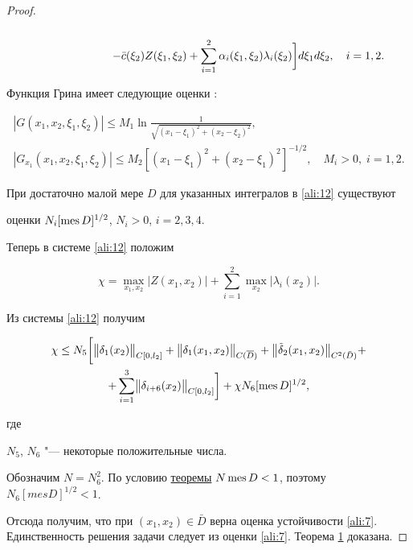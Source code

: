 \begin{proof}
\begin{equation}
\begin{array}{l}
\\

\displaystyle \hspace{2.5cm}

-\bar{c}(\xi_2)Z(\xi_1,\xi_2)+\sum\limits_{i=1}^2{\alpha_i}(\xi_1,\xi_2)\lambda_i(\xi_2)\biggr]d\xi_1d\xi_2, \quad i = 1, 2.

\end{array}

\label{ali:12}

\end{equation}



Функция Грина имеет следующие оценки \cite{ali:bib:25}:

\begin{gather}

|G(x_1,x_2,\xi_1,\xi_2)|\le M_1\ln\frac{1}{\sqrt{(x_1-\xi_1)^2+(x_2-\xi_2)^2}},

\\

\label{ali:13}

|G_{x_1}(x_1,x_2,\xi_1,\xi_2)|\le M_2[(x_1-\xi_1)^2+(x_2-\xi_1)^2]^{- 1/2}, \quad M_i>0,\; i=1, 2.

\end{gather}



При достаточно малой мере $D$ для указанных интегралов в \eqref{ali:12} су\-щест\-вуют 

оценки $N_i[\mathop{\rm mes}D]^{1/2}$, $N_i>0$, $i=2, 3, 4$. 

Теперь в системе \eqref{ali:12} положим 

$$

\chi=\max\limits_{x_1,x_2}|Z(x_1,x_2)|+\sum\limits_{i=1}^2 \max\limits_{x_2}|\lambda_i(x_2)|.

$$



Из системы \eqref{ali:12} получим

\begin{multline*}

\chi\le N_5\biggl[\bigl\|\delta_1(x_2)\bigr\|_{C[0,l_2]}+

\bigl\|\delta_1(x_1,x_2)\bigr\|_{C(\overline{D})}+

\bigl\|\tilde{\delta}_2(x_1,x_2)\bigr\|_{C^2(\bar{D})}+

\\ 

+\sum\limits_{i=1}^3 \bigl\|\delta_{i+6}(x_2)\bigr\|_{C[0,l_2]}\biggr]+\chi N_6[\mathop{\rm mes}D]^{1/2},

\end{multline*}

где

$N_5$, $N_6$ "--- некоторые положительные числа. 

Обозначим $N=N_6^2$. По условию \hyperlink{ali:thm1}{теоремы}  $N\mathop{\rm mes}D<1$, поэтому $N_6[mesD]^{1/2}<1$. 

Отсюда получим, что при $(x_1,x_2)\in\bar{D}$ верна оценка устойчивости \eqref{ali:7}. Единственность решения задачи следует из оценки \eqref{ali:7}. Теорема  \hyperlink{ali:thm1}{1} доказана. \end{proof}
